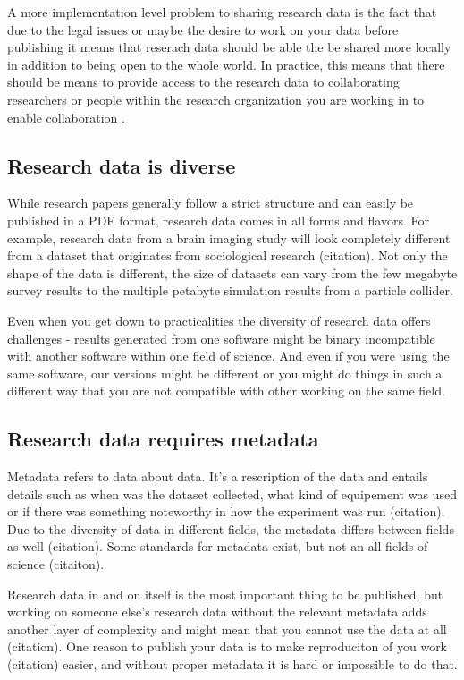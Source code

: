 A more implementation level problem to sharing research data is the fact that
due to the legal issues or maybe the desire to work on your data before
publishing it means that reserach data should be able the be shared more
locally in addition to being open to the whole world. In practice, this means
that there should be means to provide access to the research data to
collaborating researchers or people within the research organization you are
working in to enable collaboration \cite{DBLP:journals/libt/Witt08}.

\iffalse
\subsection{Research data is diverse}

While research papers generally follow a
strict structure and can easily be published in a PDF format, research data
comes in all forms and flavors. For example, research data from a brain imaging
study will look completely different from a dataset that originates from
sociological research (citation). Not only the shape of the data is different,
the size of datasets can vary from the few megabyte survey results to the
multiple petabyte simulation results from a particle collider.

Even when you get down to practicalities the diversity of research data offers
challenges - results generated from one software might be binary incompatible
with another software within one field of science. And even if you were using
the same software, our versions might be different or you might do things in
such a different way that you are not compatible with other working on the
same field.

\subsection{Research data requires metadata}

Metadata refers to data about data. It's a rescription of the data and entails
details such as when was the dataset collected, what kind of equipement was
used or if there was something noteworthy in how the experiment was run
(citation). Due to the diversity of data in different fields, the metadata
differs between fields as well (citation). Some standards for metadata exist,
but not an all fields of science (citaiton).

Research data in and on itself is the most important thing to be published, but
working on someone else's research data without the relevant metadata adds
another layer of complexity and might mean that you cannot use the data at all
(citation). One reason to publish your data is to make reproduciton of you work
(citation) easier, and without proper metadata it is hard or impossible to
do that.

